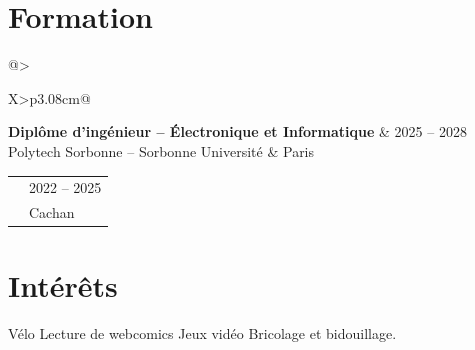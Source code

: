 \documentclass[10pt,a4paper]{extarticle}
\makeatletter
\newcommand{\entry}[4]{%
\begin{tabularx}{\linewidth}{@{}>{\raggedright\arraybackslash}X>{\raggedleft\arraybackslash}p{3.08cm}@{}}
 {\bfseries\color{bleu}#1} & {\fontsize{9}{10.3}\selectfont\color{secondaire}#2} \\[-2pt]
 {\fontsize{9}{10.4}\selectfont\color{secondaire}#3} & {\fontsize{9}{10.3}\selectfont\color{secondaire}#4}
\end{tabularx}\vspace{-2.6pt}\par}
\makeatother
\begin{document}
\section{Formation}
\entry{Diplôme d'ingénieur -- Électronique et Informatique}{2025 -- 2028}{Polytech Sorbonne -- Sorbonne Université}{Paris}
\vspace{1pt}
\entry{BUT Génie électrique et informatique industrielle -- option Électricité et maîtrise de l'énergie}{2022 -- 2025}{IUT de Cachan -- Université Paris-Saclay}{Cachan}

\section{Intérêts}
{\fontsize{9.4}{11.2}\selectfont
Vélo \textcolor{rouge}{\textbullet} Lecture de webcomics \textcolor{rouge}{\textbullet} Jeux vidéo \textcolor{rouge}{\textbullet} Bricolage et bidouillage.
}
\end{document}
